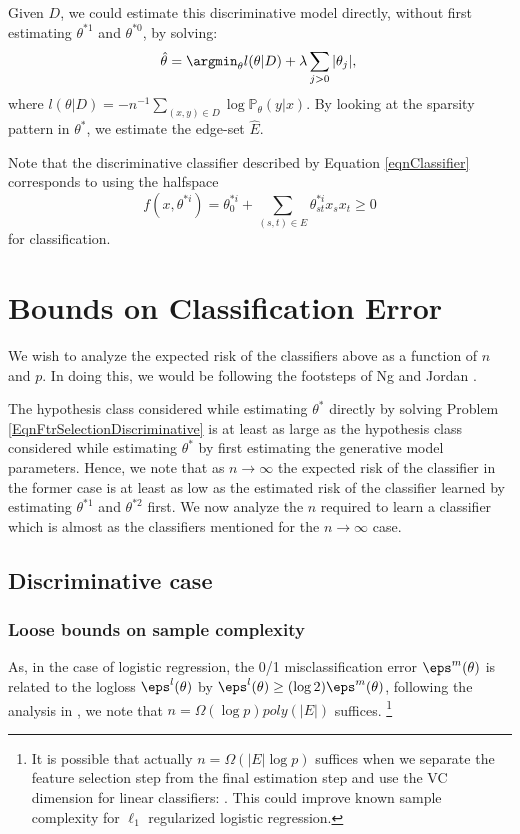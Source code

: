 \documentclass{article}
\def\edgeEst{\hat{E}}
\def\thetaEst{\hat{\theta}}
\def\mprob{\mathbb{P}}
\begin{document}
Given $D$, we could estimate this discriminative model directly, without first estimating $\theta^{*1}$ and $\theta^{*0}$, by solving:
\begin{equation}
\label{EqnFtrSelectionDiscriminative}
\thetaEst = \argmin_{\theta} l(\theta|D) + \lambda \sum_{j>0}|\theta_j|, \\
\end{equation}
where $l(\theta|D) = -n^{-1}\sum_{(x, y) \in D} \log \mprob_{\theta}(y|x)$. By looking at the sparsity pattern in $\theta^*$, we estimate the edge-set $\edgeEst$.

Note that the discriminative classifier described by Equation \ref{eqnClassifier} corresponds to using the halfspace
\begin{equation}
\label{eqnDiscriminant}
f(x, \theta^{*i}) = \theta^{*i}_0 + \sum_{(s, t) \in E}\theta^{*i}_{st} x_s x_t \geq 0
\end{equation}
for classification.

\section{Bounds on Classification Error}
We wish to analyze the expected risk of the classifiers above as a function of $n$ and $p$. In doing this, we would be following the footsteps of Ng and Jordan \cite{ng2001}.

The hypothesis class considered while estimating $\theta^*$ directly by solving Problem \ref{EqnFtrSelectionDiscriminative} is at least as large as the hypothesis class considered while estimating $\theta^*$ by first estimating the generative model parameters. Hence, we note that as $n \to \infty$ the expected risk of the classifier in the former case is at least as low as the estimated risk of the classifier learned by estimating $\theta^{*1}$ and $\theta^{*2}$ first. We now analyze the $n$ required to learn a classifier which is almost as the classifiers mentioned for the $n \to \infty$ case.

\subsection{Discriminative case}
\subsubsection{Loose bounds on sample complexity}
As, in the case of logistic regression, the 0/1 misclassification error $\eps^m(\theta)$ is related to the logloss $\eps^l(\theta)$ by $\eps^l(\theta) \geq (\log 2)\eps^m(\theta)$, following the analysis in \cite{ng:04}, we note that $n = \Omega(\log p)poly(|E|)$ suffices. \footnote{It is possible that actually $n = \Omega(|E|\log p)$ suffices when we separate the feature selection step from the final estimation step and use the VC dimension for linear classifiers: \chk. This could improve known sample complexity for $\ell_1$ regularized logistic regression.}
\end{document}
